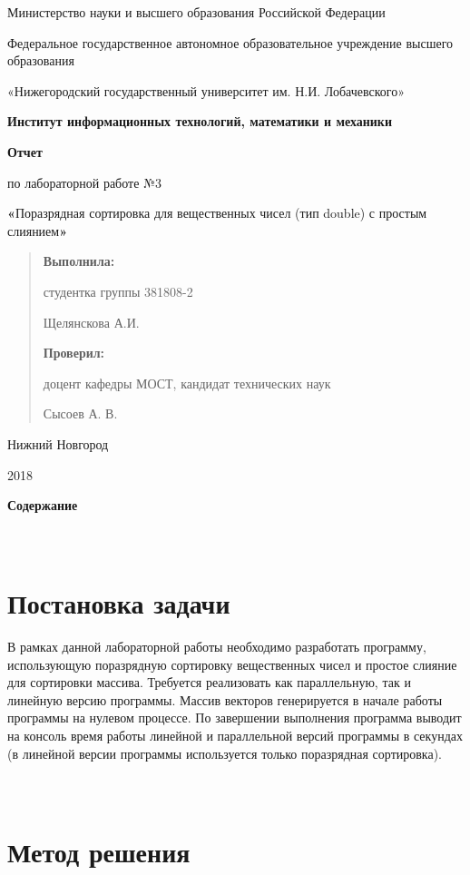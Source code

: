 \documentclass[]{article}
\date{}
\begin{document}
Министерство науки и высшего образования Российской Федерации

Федеральное государственное автономное образовательное учреждение
высшего образования

«Нижегородский государственный университет им. Н.И. Лобачевского»

\textbf{Институт информационных технологий, математики и механики}

\textbf{Отчет}

по лабораторной работе №3

\textbf{«}Поразрядная сортировка для вещественных чисел (тип double) с
простым слиянием\textbf{»}

\begin{quote}
\textbf{Выполнила:}

студентка группы 381808-2

Щелянскова А.И.

\textbf{Проверил:}

доцент кафедры МОСТ, кандидат технических наук

Сысоев А. В.
\end{quote}

Нижний Новгород

2018

\textbf{Содержание}

\section{\texorpdfstring{\\
Постановка
задачи}{ Постановка задачи}}\label{ux43fux43eux441ux442ux430ux43dux43eux432ux43aux430-ux437ux430ux434ux430ux447ux438}

\protect\hypertarget{_heading=h.30j0zll}{}{}В рамках данной лабораторной
работы необходимо разработать программу, использующую поразрядную
сортировку вещественных чисел и простое слияние для сортировки массива.
Требуется реализовать как параллельную, так и линейную версию программы.
Массив векторов генерируется в начале работы программы на нулевом
процессе. По завершении выполнения программа выводит на консоль время
работы линейной и параллельной версий программы в секундах (в линейной
версии программы используется только поразрядная сортировка).

\section{\texorpdfstring{\\
Метод
решения}{ Метод решения}}\label{ux43cux435ux442ux43eux434-ux440ux435ux448ux435ux43dux438ux44f}
\end{document}
